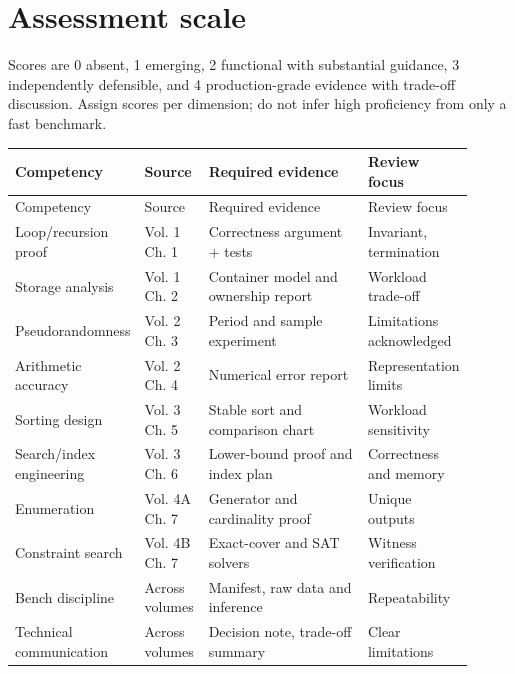 \documentclass[11pt,letterpaper]{article}
\begin{document}
\tableofcontents
\clearpage
{}
\section{Assessment scale}
Scores are 0 absent, 1 emerging, 2 functional with substantial guidance, 3 independently defensible, and 4 production-grade evidence with trade-off discussion. Assign scores per dimension; do not infer high proficiency from only a fast benchmark.
\small
\begin{longtable}{@{}>{\raggedright\arraybackslash}p{0.23\linewidth}p{0.14\linewidth}>{\raggedright\arraybackslash}p{0.37\linewidth}>{\raggedright\arraybackslash}p{0.17\linewidth}@{}}
\toprule Competency & Source & Required evidence & Review focus\\\midrule\endfirsthead
\toprule Competency & Source & Required evidence & Review focus\\\midrule\endhead
Loop/recursion proof & Vol. 1 Ch. 1 & Correctness argument + tests & Invariant, termination\\
Storage analysis & Vol. 1 Ch. 2 & Container model and ownership report & Workload trade-off\\
Pseudorandomness & Vol. 2 Ch. 3 & Period and sample experiment & Limitations acknowledged\\
Arithmetic accuracy & Vol. 2 Ch. 4 & Numerical error report & Representation limits\\
Sorting design & Vol. 3 Ch. 5 & Stable sort and comparison chart & Workload sensitivity\\
Search/index engineering & Vol. 3 Ch. 6 & Lower-bound proof and index plan & Correctness and memory\\
Enumeration & Vol. 4A Ch. 7 & Generator and cardinality proof & Unique outputs\\
Constraint search & Vol. 4B Ch. 7 & Exact-cover and SAT solvers & Witness verification\\
Bench discipline & Across volumes & Manifest, raw data and inference & Repeatability\\
Technical communication & Across volumes & Decision note, trade-off summary & Clear limitations\\
\bottomrule\end{longtable}\normalsize
\end{document}
